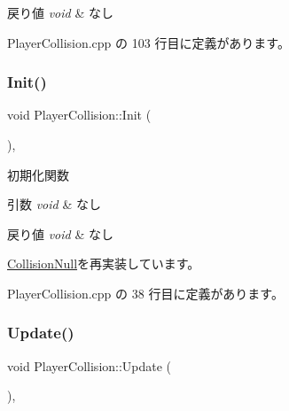 \begin{DoxyRetVals}{戻り値}
{\em void} & なし \\
\hline
\end{DoxyRetVals}


 Player\+Collision.\+cpp の 103 行目に定義があります。

\mbox{\label{class_player_collision_a3dd6238b75933fd60aee77e92353cc44}} 
\subsubsection{\texorpdfstring{Init()}{Init()}}
{\footnotesize\ttfamily void Player\+Collision\+::\+Init (\begin{DoxyParamCaption}{ }\end{DoxyParamCaption})\hspace{0.3cm}{\ttfamily [override]}, {\ttfamily [virtual]}}



初期化関数 


\begin{DoxyParams}{引数}
{\em void} & なし \\
\hline
\end{DoxyParams}

\begin{DoxyRetVals}{戻り値}
{\em void} & なし \\
\hline
\end{DoxyRetVals}


\mbox{\hyperlink{class_collision_null_a18cfc21fefcd3e8dec380ac44a85f111}{Collision\+Null}}を再実装しています。



 Player\+Collision.\+cpp の 38 行目に定義があります。

\mbox{\label{class_player_collision_a09f97f220903f5724a3af6b97af3a336}} 
\subsubsection{\texorpdfstring{Update()}{Update()}}
{\footnotesize\ttfamily void Player\+Collision\+::\+Update (\begin{DoxyParamCaption}{ }\end{DoxyParamCaption})\hspace{0.3cm}{\ttfamily [override]}, {\ttfamily [virtual]}}



